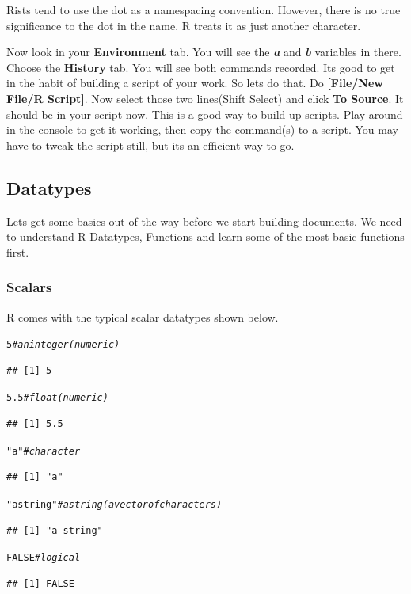\documentclass[draft]{article}\usepackage[]{graphicx}\usepackage[]{color}
\makeatletter
\newcommand{\hlnum}[1]{\textcolor[rgb]{0.686,0.059,0.569}{#1}}%
\newcommand{\hlstr}[1]{\textcolor[rgb]{0.192,0.494,0.8}{#1}}%
\newcommand{\hlcom}[1]{\textcolor[rgb]{0.678,0.584,0.686}{\textit{#1}}}%
\newenvironment{kframe}{%
 \def\at@end@of@kframe{}%
 \ifinner\ifhmode%
  \def\at@end@of@kframe{\end{minipage}}%
  \begin{minipage}{\columnwidth}%
 \fi\fi%
 \def\FrameCommand##1{\hskip\@totalleftmargin \hskip-\fboxsep
 \colorbox{shadecolor}{##1}\hskip-\fboxsep
     \hskip-\linewidth \hskip-\@totalleftmargin \hskip\columnwidth}%
 \MakeFramed {\advance\hsize-\width
   \@totalleftmargin\z@ \linewidth\hsize
   \@setminipage}}%
 {\par\unskip\endMakeFramed%
 \at@end@of@kframe}
\newenvironment{knitrout}{}{} %
\makeatother
\begin{document}
    Rists tend to use the dot as a namespacing convention. However, there is no true significance to the dot in the name. R treats it as just another character.
    
    Now look in your \textbf{Environment} tab. You will see the \textbf{\textit{a}} and \textbf{\textit{b}} variables in there. Choose the \textbf{History} tab. You will see both commands recorded. Its good to get in the habit of building a script of your work. So lets do that. Do \textbf{[File/New File/R Script]}. Now select those two lines(Shift Select) and click \textbf{To Source}. It should be in your script now. This is a good way to build up scripts. Play around in the console to get it working, then copy the command(s) to a script. You may have to tweak the script still, but its an efficient way to go.
    
  \subsection*{Datatypes}
    
    Lets get some basics out of the way before we start building documents. We need to understand R Datatypes, Functions and learn some of the most basic functions first.
    
    \subsubsection*{Scalars}
    R comes with the typical scalar datatypes shown below.
    
\begin{knitrout}
\color{fgcolor}\begin{kframe}
\begin{alltt}
  \hlnum{5} \hlcom{# an integer (numeric)}
\end{alltt}
\begin{verbatim}
## [1] 5
\end{verbatim}
\begin{alltt}
  \hlnum{5.5} \hlcom{# float (numeric)}
\end{alltt}
\begin{verbatim}
## [1] 5.5
\end{verbatim}
\begin{alltt}
  \hlstr{"a"} \hlcom{#character}
\end{alltt}
\begin{verbatim}
## [1] "a"
\end{verbatim}
\begin{alltt}
  \hlstr{"a string"}  \hlcom{# a string (a vector of characters)}
\end{alltt}
\begin{verbatim}
## [1] "a string"
\end{verbatim}
\begin{alltt}
  \hlnum{FALSE} \hlcom{# logical}
\end{alltt}
\begin{verbatim}
## [1] FALSE
\end{verbatim}
\end{kframe}
\end{knitrout}
    
\end{document}
